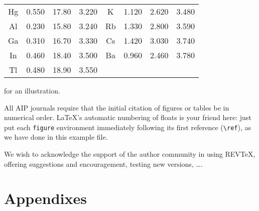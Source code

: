\documentclass[%
 aip,
 jmp,%
 amsmath,amssymb,
preprint,%
 reprint,%
]{revtex4-2}
\begin{document}
\begin{table}
\begin{ruledtabular}
\begin{tabular}{cccccccc}
      Hg & 0.550       & 17.80       & 3.220        & K\footnotemark[5]
         & 1.120       & 2.620       & 3.480                                     \\
      Al & 0.230       & 15.80       & 3.240        & Rb\footnotemark[3]
         & 1.330       & 2.800       & 3.590                                     \\
      Ga & 0.310       & 16.70       & 3.330        & Cs\footnotemark[4]
         & 1.420       & 3.030       & 3.740                                     \\
      In & 0.460       & 18.40       & 3.500        & Ba\footnotemark[5]
         & 0.960       & 2.460       & 3.780                                     \\
      Tl & 0.480       & 18.90       & 3.550        &                    &  &  & \\
    \end{tabular}
  \end{ruledtabular}
\end{table}
for an illustration.

All AIP journals require that the initial citation of
figures or tables be in numerical order.
\LaTeX's automatic numbering of floats is your friend here:
just put each \texttt{figure} environment immediately following
its first reference (\verb+\ref+), as we have done in this example file.

\begin{acknowledgments}
  We wish to acknowledge the support of the author community in using
  REV\TeX{}, offering suggestions and encouragement, testing new versions,
  \dots.
\end{acknowledgments}

\appendix

\section{Appendixes}
\end{document}
